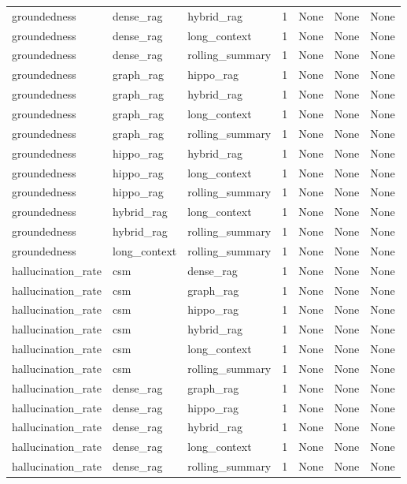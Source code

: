 \begin{tabular}{lllllll}
groundedness & dense\_rag & hybrid\_rag & 1 & None & None & None \\
groundedness & dense\_rag & long\_context & 1 & None & None & None \\
groundedness & dense\_rag & rolling\_summary & 1 & None & None & None \\
groundedness & graph\_rag & hippo\_rag & 1 & None & None & None \\
groundedness & graph\_rag & hybrid\_rag & 1 & None & None & None \\
groundedness & graph\_rag & long\_context & 1 & None & None & None \\
groundedness & graph\_rag & rolling\_summary & 1 & None & None & None \\
groundedness & hippo\_rag & hybrid\_rag & 1 & None & None & None \\
groundedness & hippo\_rag & long\_context & 1 & None & None & None \\
groundedness & hippo\_rag & rolling\_summary & 1 & None & None & None \\
groundedness & hybrid\_rag & long\_context & 1 & None & None & None \\
groundedness & hybrid\_rag & rolling\_summary & 1 & None & None & None \\
groundedness & long\_context & rolling\_summary & 1 & None & None & None \\
hallucination\_rate & csm & dense\_rag & 1 & None & None & None \\
hallucination\_rate & csm & graph\_rag & 1 & None & None & None \\
hallucination\_rate & csm & hippo\_rag & 1 & None & None & None \\
hallucination\_rate & csm & hybrid\_rag & 1 & None & None & None \\
hallucination\_rate & csm & long\_context & 1 & None & None & None \\
hallucination\_rate & csm & rolling\_summary & 1 & None & None & None \\
hallucination\_rate & dense\_rag & graph\_rag & 1 & None & None & None \\
hallucination\_rate & dense\_rag & hippo\_rag & 1 & None & None & None \\
hallucination\_rate & dense\_rag & hybrid\_rag & 1 & None & None & None \\
hallucination\_rate & dense\_rag & long\_context & 1 & None & None & None \\
hallucination\_rate & dense\_rag & rolling\_summary & 1 & None & None & None \\

\end{tabular}
